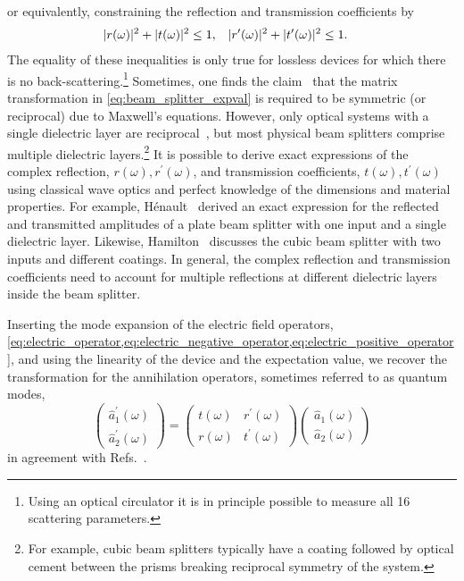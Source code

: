 or equivalently, constraining the reflection and transmission coefficients by
\begin{align}
    \lvert r(\omega)\rvert^2+\lvert t(\omega)\rvert^2
    &\leq
    1,
    &
    \lvert r^\prime(\omega)\rvert^2+\lvert t^\prime(\omega)\rvert^2
    &\leq
    1
    \label{eq:beam_splitter_coefficients_constraint}
    .
\end{align}
The equality of these inequalities is only true for lossless devices for which there is no back-scattering.\footnote{Using an optical circulator it is in principle possible to measure all \num{16} scattering parameters.}
Sometimes, one finds the claim~\cite[p.~129]{Haroche2006} that the matrix transformation in \cref{eq:beam_splitter_expval} is required to be symmetric (or reciprocal) due to Maxwell's equations.
However, only optical systems with a single dielectric layer are reciprocal~\cite{Potton2004}, but most physical beam splitters comprise multiple dielectric layers.\footnote{For example, cubic beam splitters typically have a coating followed by optical cement between the prisms breaking reciprocal symmetry of the system.}
It is possible to derive exact expressions of the complex reflection, $r(\omega),r^\prime(\omega)$, and transmission coefficients, $t(\omega),t^\prime(\omega)$ using classical wave optics and perfect knowledge of the dimensions and material properties.
For example, Hénault~\cite{Henault2015} derived an exact expression for the reflected and transmitted amplitudes of a plate beam splitter with one input and a single dielectric layer.
Likewise, Hamilton~\cite{Hamilton2000} discusses the cubic beam splitter with two inputs and different coatings.
In general, the complex reflection and transmission coefficients need to account for multiple reflections at different dielectric layers inside the beam splitter.

Inserting the mode expansion of the electric field operators, \cref{eq:electric_operator,eq:electric_negative_operator,eq:electric_positive_operator}, and using the linearity of the device and the expectation value, we recover the transformation for the annihilation operators, sometimes referred to as quantum modes,
\begin{equation}
    \begin{pmatrix}
        \hat{a}_1^\prime(\omega) \\
        \hat{a}_2^\prime(\omega)
    \end{pmatrix}
    =
    \begin{pmatrix}
        t(\omega) & r^\prime(\omega)
        \\
        r(\omega) & t^\prime(\omega)
    \end{pmatrix}
    \begin{pmatrix}
        \hat{a}_1(\omega) \\
        \hat{a}_2(\omega)
    \end{pmatrix}
    \label{eq:beam_splitter_annihilation}
\end{equation}
in agreement with Refs.~\cite{Leonhardt2010,Gerry2005}.

